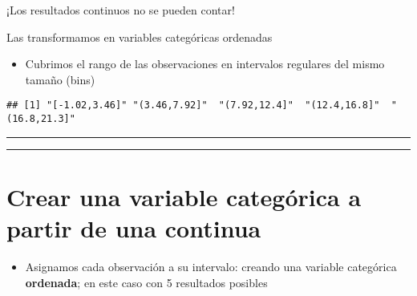 \documentclass[
]{book}
\providecommand{\tightlist}{%
  \setlength{\itemsep}{0pt}\setlength{\parskip}{0pt}}
\begin{document}
¡Los resultados continuos no se pueden contar!

Las transformamos en variables categóricas ordenadas

\begin{itemize}
\tightlist
\item
  Cubrimos el rango de las observaciones en intervalos regulares del mismo tamaño (bins)
\end{itemize}

\begin{verbatim}
## [1] "[-1.02,3.46]" "(3.46,7.92]"  "(7.92,12.4]"  "(12.4,16.8]"  "(16.8,21.3]"
\end{verbatim}

\begin{center}\rule{0.5\linewidth}{0.5pt}\end{center}

\begin{center}\rule{0.5\linewidth}{0.5pt}\end{center}

\hypertarget{crear-una-variable-categuxf3rica-a-partir-de-una-continua}{%
\section{Crear una variable categórica a partir de una continua}\label{crear-una-variable-categuxf3rica-a-partir-de-una-continua}}

\begin{itemize}
\tightlist
\item
  Asignamos cada observación a su intervalo: creando una variable categórica \textbf{ordenada}; en este caso con 5 resultados posibles
\end{itemize}
\end{document}
